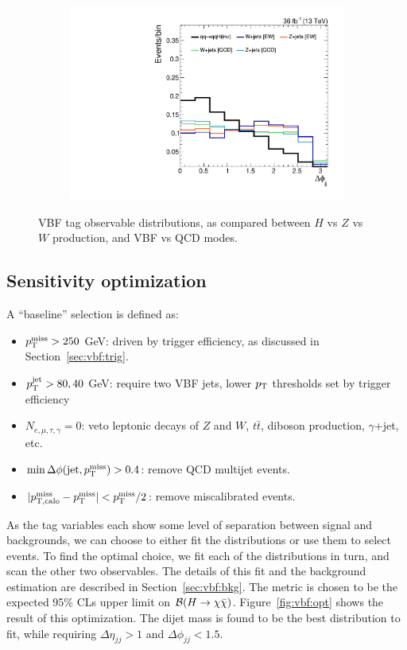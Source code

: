 \begin{figure}[]
\begin{center}
\begin{subfigure}[t]{0.32\textwidth}
            \includegraphics[width=\textwidth]{figures/vbf/shapes/loosesignal_jot12DPhi.pdf}
            \caption{\dphi}
        \end{subfigure}
        \caption{VBF tag observable distributions, as compared between $H$ vs $Z$ vs $W$ production, and VBF vs QCD modes.}
        \label{fig:vbf:dijetkins}
    \end{center}
\end{figure}

\subsection{Sensitivity optimization}

A ``baseline'' selection is defined as:
\begin{itemize}
    \item $p_\mathrm{T}^\mathrm{miss}>250$ GeV: driven by trigger efficiency, as discussed in Section~\ref{sec:vbf:trig}.
    \item $p_\mathrm{T}^\mathrm{jet}>80,40$ GeV: require two VBF jets, lower $p_\mathrm{T}$ thresholds set by trigger efficiency
    \item $N_{e,\mu,\tau,\gamma}=0$: veto leptonic decays of $Z$ and $W$, $t\bar{t}$, diboson production, $\gamma$+jet, etc.
    \item $\min\Delta\phi(\mathrm{jet},p_\mathrm{T}^\mathrm{miss})>0.4$: remove QCD multijet events.
    \item $|p^\mathrm{miss}_\mathrm{T,calo}-p_\mathrm{T}^\mathrm{miss}|<p_\mathrm{T}^\mathrm{miss}/2$: remove miscalibrated events.
\end{itemize}

As the tag variables each show some level of separation between signal and backgrounds, we can choose to either fit the distributions or use them to select events. 
To find the optimal choice, we fit each of the distributions in turn, and scan the other two observables.
The details of this fit and the background estimation are described in Section~\ref{sec:vbf:bkg}.
The metric is chosen to be the expected 95\% CLs upper limit on $\mathcal{B}(H\rightarrow\chi\bar\chi)$.
Figure~\ref{fig:vbf:opt} shows the result of this optimization.
The dijet mass is found to be the best distribution to fit, while requiring $\Delta\eta_{jj}>1$ and $\Delta\phi_{jj}<1.5$.

